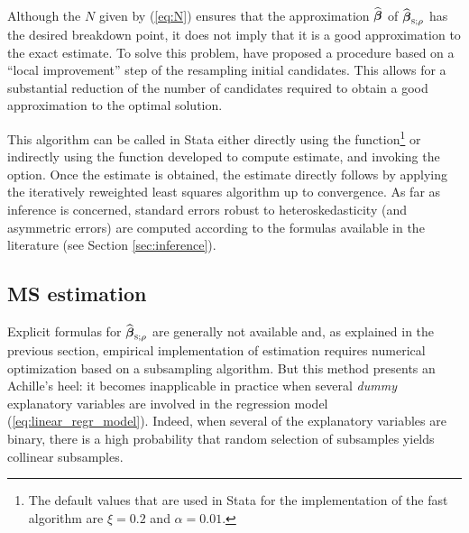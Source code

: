 Although the $N$ given by (\ref{eq:N}) ensures that the approximation
$\widehat{\boldsymbol\beta}$ of $\sthat{\boldsymbol\beta}_{\stsc{S};\rho}$ 
has the desired breakdown point, it does not imply that it is a good
approximation to the exact  estimate. To solve this problem, 
\citet{salibian:yohai:2006} have proposed a procedure based on a “local
improvement” step of the resampling initial candidates. This
allows for a substantial reduction of the number of candidates required to
obtain a good approximation to the optimal solution.

This algorithm can be called in Stata either directly using the  function\footnote{The default values that are used in Stata for the
implementation of the fast  algorithm are $\xi = 0.2$ and $\alpha =
0.01$.} or indirectly using the  function developed to compute
 estimate, and invoking the  option. Once the 
estimate is obtained, the  estimate directly follows by applying the
iteratively reweighted least squares algorithm up to convergence. As far as
inference is concerned, standard errors robust to heteroskedasticity (and
asymmetric errors) are computed according to the formulas available in the
literature (see Section \ref{sec:inference}).

\subsection{MS estimation}

Explicit formulas for $\sthat{\boldsymbol\beta}_{\stsc{S};\rho}$ are generally
not available and, as explained in the previous section, empirical
implementation of  estimation requires numerical optimization based on
a subsampling algorithm. But this method presents an Achille's heel: it becomes
inapplicable in practice when several \emph{dummy} explanatory variables are
involved in the regression model (\ref{eq:linear_regr_model}). Indeed, when
several of the explanatory variables are binary, there is a high probability
that random selection of subsamples yields collinear subsamples.

